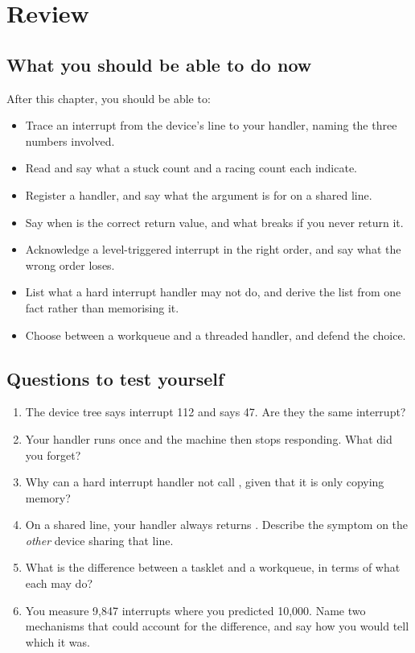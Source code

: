 
\section{Review}
\label{c8:sec:review}

\subsection*{What you should be able to do now}
After this chapter, you should be able to:
\begin{itemize}
  \item Trace an interrupt from the device's line to your handler, naming the three numbers
    involved.
  \item Read  and say what a stuck count and a racing count each indicate.
  \item Register a handler, and say what the  argument is for on a shared line.
  \item Say when  is the correct return value, and what breaks if you never return
    it.
  \item Acknowledge a level-triggered interrupt in the right order, and say what the wrong order
    loses.
  \item List what a hard interrupt handler may not do, and derive the list from one fact rather than
    memorising it.
  \item Choose between a workqueue and a threaded handler, and defend the choice.
\end{itemize}

\subsection*{Questions to test yourself}
\begin{enumerate}
  \item The device tree says interrupt 112 and  says 47. Are they the same
    interrupt?
  \item Your handler runs once and the machine then stops responding. What did you forget?
  \item Why can a hard interrupt handler not call , given that it is only copying
    memory?
  \item On a shared line, your handler always returns . Describe the symptom on
    the \emph{other} device sharing that line.
  \item What is the difference between a tasklet and a workqueue, in terms of what each may do?
  \item You measure 9,847 interrupts where you predicted 10,000. Name two mechanisms that could
    account for the difference, and say how you would tell which it was.
\end{enumerate}

